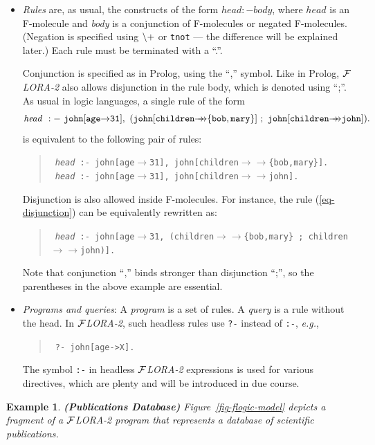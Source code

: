 \documentclass[11pt]{article}
\newtheorem{example}{Example}[section]
\newcommand{\fd}{\ensuremath{{\rightarrow}}}                   %
\newcommand{\mvd}{\ensuremath{{\rightarrow\!\!\!\!\rightarrow}}}  %
\newcommand{\FLORA}{{\mbox{${\cal F}${\small\it LORA}\rm\emph{-2}}}\xspace}
\newcommand{\NAF}{{$\tt\backslash +$}\xspace}
\begin{document}
\begin{itemize}
\item \emph{Rules} are, as usual, the constructs of the form $head :-
  body$, where $head$ is an F-molecule and \emph{body} is a conjunction of
  F-molecules or negated F-molecules. (Negation is specified using {\NAF}
    or {\tt tnot} --- the difference will be explained later.)
  Each rule must be terminated with a ``.''.
  
  Conjunction is specified as in Prolog, using the ``,'' symbol. Like in
  Prolog, \FLORA also allows disjunction in the rule body, which is denoted
  using ``;''. As usual in logic languages, a single rule of the form
  \begin{equation}\label{eq-disjunction}
  {\tt
    {\it head}~:-~john[age{\fd}31],~(john[children\mvd\{bob,mary\}]~;~
    john[children\mvd john]).
    }
  \end{equation}
  is equivalent to the following pair of rules:
  \begin{quote}
  {\tt
    {\it head}~:-~john[age{\fd}31],~john[children\mvd\{bob,mary\}].
    }
  \\
  {\tt
    {\it head}~:-~john[age{\fd}31],~john[children\mvd john].
    }
  \end{quote}
  Disjunction is also allowed inside F-molecules. For instance, the rule
  (\ref{eq-disjunction}) can be equivalently rewritten as:
  \begin{quote}
 {\tt
   {\it head}~:-~john[age{\fd}31,~(children\mvd\{bob,mary\}~;~children\mvd john)].
   }
  \end{quote}
  Note that conjunction ``,'' binds stronger than disjunction ``;'', so the
  parentheses in the above example are essential.
  
\item \emph{Programs and queries}: A \emph{program} is a set of rules. A
  \emph{query} is a rule without the head. In \FLORA, such headless rules
  use {\tt ?-} instead of {\tt :-}, {\it e.g.}, 
  \begin{quote}
    {\tt 
    ?-~john[age->X].    
    }
  \end{quote}
  The symbol {\tt :-} in headless \FLORA expressions is used for various
  directives, which are plenty and will be introduced in due course.
\end{itemize}



\begin{example}
  {\bf (Publications Database)} \rm Figure~\ref{fig-flogic-model} depicts
  a fragment of a \FLORA program that represents a database of scientific
  publications.
\end{example}
\end{document}
